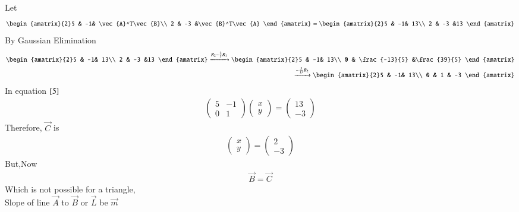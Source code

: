 \documentclass[journal]{IEEEtran}
\begin{document}
Let
\begin{align}
    \begin{amatrix}{2}5 & -1& \vec{A}^T\vec{B}\\ 2 & -3 &\vec{B}^T\vec{A} \end{amatrix} = \begin{amatrix}{2}5 & -1& 13\\ 2 & -3 &13 \end{amatrix}
\end{align}
By Gaussian Elimination
\begin{align}
    \begin{amatrix}{2}5 & -1& 13\\ 2 & -3 &13 \end{amatrix}\xrightarrow{R_2-\frac{2}{5}R_1}\begin{amatrix}{2}5 & -1& 13\\ 0 & \frac{-13}{5} &\frac{39}{5} \end{amatrix}\\
    \xrightarrow{-\frac{5}{13}R_2}\begin{amatrix}{2}5 & -1& 13\\ 0 & 1 & -3 \end{amatrix}
\end{align}
In equation $\eqref{5}$ 
\begin{align}
    \begin{pmatrix}5 & -1\\ 0 & 1\end{pmatrix}\begin{pmatrix}x\\ y\end{pmatrix}=\begin{pmatrix}13\\ -3\end{pmatrix}
\end{align}
Therefore, $\vec{C}$ is
\begin{align}
    \begin{pmatrix}x\\y\end{pmatrix} = \begin{pmatrix}2\\-3\end{pmatrix}
\end{align}
But,Now
\begin{align}
    \vec{B}=\vec{C}
\end{align}
Which is not possible for a triangle,\\
Slope of line $\vec{A}$ to $\vec{B}$ or $\vec{L}$ be $\vec{m}$
\end{document}
